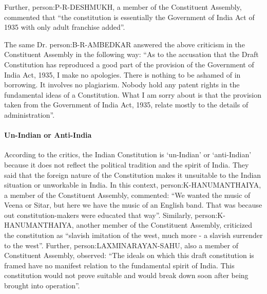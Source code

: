 \begin{multicols}{2}
Further, \gls{person:P-R-DESHMUKH}, a member of the Constituent Assembly, commented that ``the constitution is essentially the Government of India Act of 1935 with only adult franchise added''.

The same Dr. \gls{person:B-R-AMBEDKAR} answered the above criticism in the Constituent Assembly in the following way: ``As to the accusation that the Draft Constitution has reproduced a good part of the provision of the Government of India Act, 1935, I make no apologies. There is nothing to be ashamed of in borrowing. It involves no plagiarism. Nobody hold any patent rights in the fundamental ideas of a Constitution. What I am sorry about is that the provision taken from the Government of India Act, 1935, relate mostly to the details of administration''.

\paragraph{Un-Indian or Anti-India}
According to the critics, the Indian Constitution is `un-Indian' or `anti-Indian' because it does not reflect the political tradition and the spirit of India. They said that the foreign nature of the Constitution makes it unsuitable to the Indian situation or unworkable in India. In this context, \gls{person:K-HANUMANTHAIYA}, a member of the Constituent Assembly, commented: ``We wanted the music of Veena or Sitar, but here we have the music of an English band. That was because out constitution-makers were educated that way''. Similarly, \gls{person:K-HANUMANTHAIYA}, another member of the Constituent Assembly, criticized the constitution as ``slavish imitation of the west, much more - a slavish surrender to the west''. Further, \gls{person:LAXMINARAYAN-SAHU}, also a member of Constituent Assembly, observed: ``The ideals on which this draft constitution is framed have no manifest relation to the fundamental spirit of India. This constitution would not prove suitable and would break down soon after being brought into operation''.


\end{multicols}
